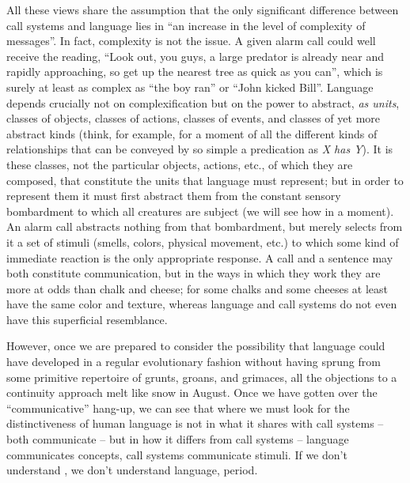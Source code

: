 All these views share the assumption that the only significant difference between call systems and language lies in ``an increase in the level of complexity of messages''. In fact, complexity is not the issue. A given alarm call could well receive the reading, ``Look out, you guys, a large predator is already near and rapidly approaching, so get up the nearest tree as quick as you can'', which is surely at least as complex as ``the boy ran'' or ``John kicked Bill''. Language depends crucially not on complexification but on the power to abstract, \textit{as units}, classes of objects, classes of actions, classes of events, and classes of yet more abstract kinds (think, for example, for a moment of all the different kinds of relationships that can be conveyed by so simple a predication as \textit{X has Y}). It is these classes, not the particular objects, actions, etc., of which they are composed, that constitute the units that language must represent; but in order to represent them it must first abstract them from the constant sensory bombardment to which all creatures are subject (we will see how in a moment). An alarm call
abstracts nothing from that bombardment, but merely selects from it a set of stimuli (smells, colors, physical movement, etc.) to which some kind of immediate reaction is the only appropriate response. A call and a sentence may both constitute communication, but in the ways in which they work they are more at odds than chalk and cheese; for some chalks and some cheeses at least have the same color and texture, whereas language and call systems do not even have this superficial resemblance.

However, once we are prepared to consider the possibility that language could have developed in a regular evolutionary fashion without having sprung from some primitive repertoire of grunts, groans, and grimaces, all the objections to a continuity approach melt like snow in August. Once we have gotten over the ``communicative'' hang-up, we can see that where we must look for the distinctiveness of human language is not in what it shares with call systems -- both communicate -- but in how it differs from call systems -- language communicates concepts, call systems communicate stimuli. If we don't understand , we don't understand language, period.

